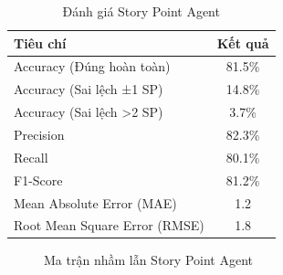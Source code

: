 \documentclass[12pt,a4paper]{report}
\begin{document}
\begin{table}[H]
\centering
\caption{Đánh giá Story Point Agent}
\begin{tabular}{|p{5cm}|c|}
\hline
\textbf{Tiêu chí} & \textbf{Kết quả} \\
\hline
Accuracy (Đúng hoàn toàn) & 81.5\% \\
\hline
Accuracy (Sai lệch ±1 SP) & 14.8\% \\
\hline
Accuracy (Sai lệch >2 SP) & 3.7\% \\
\hline
Precision & 82.3\% \\
\hline
Recall & 80.1\% \\
\hline
F1-Score & 81.2\% \\
\hline
Mean Absolute Error (MAE) & 1.2 \\
\hline
Root Mean Square Error (RMSE) & 1.8 \\
\hline
\end{tabular}
\label{tab:sp_agent_results}
\end{table}

\begin{figure}[H]
\centering
{}
\caption{Ma trận nhầm lẫn Story Point Agent}
\label{fig:sp_confusion_matrix}
\end{figure}
\end{document}
